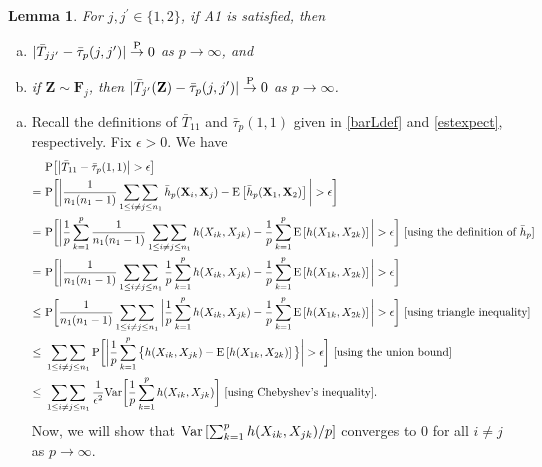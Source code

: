 \documentclass[twoside]{article}
\newcommand{\bX}{\mathbf{X}}
\newcommand{\bZ}{\mathbf{Z}}
\newcommand{\bF}{\mathbf{F}}
\newcommand{\0}{\mathbf{0}}
\newcommand{\1}{\mathbf{1}}
\numberwithin{equation}{section}
\newtheorem{lemma}[thm]{Lemma}
\begin{document}
\begin{lemma}\label{L.2}
  For $j,j^\prime\in\{1,2\}$, if {\rm A1} is satisfied, then
 \begin{enumerate}[(a)]
  \item $|\bar{T}_{jj^\prime}-\bar{\tau}_p(j,j^\prime)|\stackrel{\rm P}{\to}0$ as $p\to\infty $, and
  \item if $\bZ\sim \bF_j$, then $|\bar{T}_{j^\prime}(\bZ)-\bar{\tau}_p(j,j^\prime)|\stackrel{\rm P}{\to}0$ as $p\to\infty $.
 \end{enumerate}
\end{lemma}
\begin{enumerate}[(a)]
 \item Recall the definitions of $\bar{T}_{11}$ and $\bar{\tau}_p(1,1)$ given in \eqref{barLdef} and \eqref{estexpect}, respectively. Fix $\epsilon>0$. We have
\begin{align}\label{ref1}
&\ {\rm P}\big [\big |\bar{T}_{11} - \bar{\tau}_p(1,1)\big |>\epsilon\big ]\nonumber\\
= &\ {\rm P} \bigg [\bigg |\frac{1}{n_1(n_1-1)}\mathop{\sum\sum}\limits_{1\leq i\neq j\leq n_1}\bar{h}_p(\bX_{i},\bX_{j})-{\rm E}\left [\bar{h}_p(\bX_{1},\bX_{2})\right ]\bigg |>\epsilon \bigg]\nonumber\\
= &\ {\rm P} \bigg [\bigg |\frac{1}{p}\sum_{k=1}^p \frac{1}{n_1(n_1-1)}\mathop{\sum\sum}\limits_{1\leq i\neq j\leq n_1}{h}(X_{ik},X_{jk})-\frac{1}{p}\sum_{k=1}^p {\rm E}\left [ h(X_{1k},X_{2k})\right ]\bigg |>\epsilon \bigg]\ [\text{using the definition of }\bar{h}_p]\nonumber\\
= &\ {\rm P} \bigg [\bigg |\frac{1}{n_1(n_1-1)}\mathop{\sum\sum}\limits_{1\leq i\neq j\leq n_1}\frac{1}{p}\sum_{k=1}^p {h}(X_{ik},X_{jk}) -\frac{1}{p}\sum_{k=1}^p {\rm E}\left [ h(X_{1k},X_{2k})\right ]\bigg |>\epsilon \bigg]\nonumber \\
\leq &\ {\rm P} \bigg [\frac{1}{n_1(n_1-1)}\mathop{\sum\sum}\limits_{1\leq i\neq j\leq n_1}\bigg |\frac{1}{p}\sum_{k=1}^p {h}(X_{ik},X_{jk}) -\frac{1}{p}\sum_{k=1}^p {\rm E}\left [ h(X_{1k},X_{2k})\right ]\bigg |>\epsilon \bigg]\ [\text{using  triangle inequality}]\nonumber \\
\leq &\ \mathop{\sum\sum}\limits_{1\leq i\neq j\leq n_1}{\rm P} \bigg [\bigg |\frac{1}{p}\sum_{k=1}^p \big \{{h}(X_{ik},X_{jk}) -{\rm E}\left [ h(X_{1k},X_{2k})\right ]\big \}\bigg |>\epsilon \bigg]\ [\text{using the union bound}]\nonumber \\
\leq &\ \mathop{\sum\sum}\limits_{1\leq i\neq j\leq n_1} \frac{1}{\epsilon^2}{\rm Var}\bigg [\frac{1}{p}\sum_{k=1}^p h(X_{ik},X_{jk})\bigg ]\ [\text{using Chebyshev's inequality}].
\end{align}
Now, we will show that ${\rm Var}\left [\sum_{k=1}^p h(X_{ik},X_{jk})/p\right ]$ converges to 0 for all $i\neq j$ as $p\to\infty.$


\end{enumerate}
\end{document}
